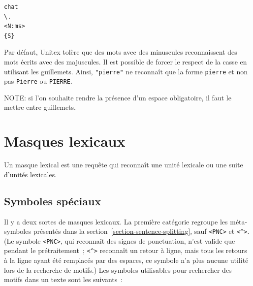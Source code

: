 \begin{verbatim}
chat
\.
<N:ms>
{S}
\end{verbatim}

\noindent Par défaut, Unitex tolère que des mots avec des minuscules reconnaissent des mots écrits
avec des majuscules. Il est possible de forcer le respect de la casse en utilisant les guillemets.
Ainsi, \verb+"pierre"+ ne reconnaît que la forme \verb+pierre+ et non pas \verb+Pierre+ ou \verb+PIERRE+.

\bigskip
\noindent NOTE: si l’on souhaite rendre la présence d’un espace obligatoire, il faut le mettre entre
guillemets.



\section{Masques lexicaux}
Un masque lexical est une requête qui reconnaît une unité lexicale ou une suite d'unités lexicales.

\subsection{Symboles spéciaux}
\label{section-special-symbols}

Il y a deux sortes de masques lexicaux. La première catégorie regroupe les méta-symboles présentés dans la
section~\ref{section-sentence-splitting}, sauf \verb$<PNC>$ et  \verb+<^>+. (Le symbole \verb$<PNC>$,
qui reconnaît des signes de ponctuation, n'est valide que pendant le prétraitement~; \verb+<^>+ reconnaît
un retour à ligne, mais tous les retours à la ligne
ayant été remplacés par des espaces, ce symbole n’a plus aucune utilité lors de la recherche de
motifs.) Les symboles utilisables pour rechercher des motifs dans un texte sont les suivants~:


